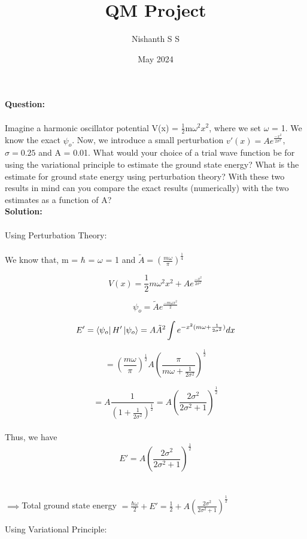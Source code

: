 \documentclass[12pt]{article}
\title{QM Project}
\author{Nishanth S S}
\date{May 2024}
\begin{document}
\maketitle

\noindent
\textbf{Question:}
\\
\\
Imagine a harmonic oscillator potential V(x) = $\frac{1}{2}$m$\omega^2 x^{2}$, where we 
set $\omega$ = 1. We know the exact $\psi_o$. Now, we introduce a small perturbation 
$v'(x) = A e^\frac{-x^2}{2\sigma^2}$,  $\sigma = 0.25$ and A = 0.01. What would your 
choice of a trial wave function be for using the variational principle to estimate 
the ground state energy? What is the estimate for ground state energy using perturbation 
theory? With these two results in mind can you compare the exact results 
(numerically) with the two estimates as a function of A? 
\\

\noindent
\textbf{Solution:}
\\
\\
Using Perturbation Theory:
\\
\\
We know that, m = $\hbar$ = $\omega$ = 1 and $\tilde{A} = (\frac{m \omega}{\pi})^\frac{1}{4}$

\[ V(x) = \frac{1}{2}m\omega^2 x^{2} + A e^{\frac{-x^2}{2\sigma^2}} \]

\[ \psi_o = \tilde{A} e^{\frac{-m \omega x^2}{2}} \]

\[ E' = \bra{\psi_o} H' \ket{\psi_o} = A\tilde{A}^2 \int e^{-x^2(m \omega + \frac{1}{2 \sigma^2})}  dx \]

\[ = (\frac{m \omega}{\pi})^\frac{1}{2} A (\frac{\pi}{m \omega + \frac{1}{2 \sigma^2}})^\frac{1}{2}\]

\[ = A \frac{1}{(1 + \frac{1}{2 \sigma^2})^\frac{1}{2}} = A (\frac{2 \sigma^2}{2 \sigma^2 + 1})^\frac{1}{2}\]
\\
Thus, we have 
\begin{equation}
	E' = A (\frac{2 \sigma^2}{2 \sigma^2 + 1})^\frac{1}{2}
\end{equation}
\\
\\
\( \implies \)Total ground state energy $= \frac{\hbar \omega}{2} + E' = \frac{1}{2} + A (\frac{2 \sigma^2}{2 \sigma^2 + 1})^\frac{1}{2} $

\vspace{2 cm}

\newpage
Using Variational Principle:
\end{document}
